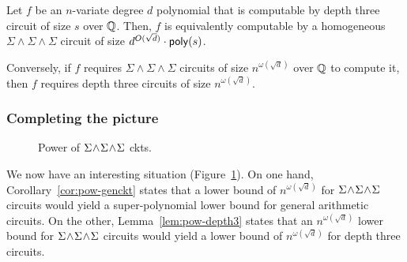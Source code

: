 \begin{lemma}\label{lem:pow-depth3}
Let $f$ be an $n$-variate degree $d$ polynomial that is computable by depth three circuit of size $s$ over $\mathbb{Q}$. Then, $f$ is equivalently computable by a homogeneous $\Sigma\!\wedge\!\Sigma\!\wedge\!\Sigma$ circuit of size $d^{O(\sqrt{d})}\cdot \mathsf{poly}(s)$. 

Conversely, if $f$ requires $\Sigma\!\wedge\!\Sigma\!\wedge\!\Sigma$ circuits of size $n^{\omega(\sqrt{d})}$ over $\mathbb{Q}$ to compute it, then $f$ requires depth three circuits of size $n^{\omega(\sqrt{d})}$. 
\end{lemma}

\subsubsection{Completing the picture}

\begin{figure}
\begin{center}
\end{center}
\caption{Power of $\Sigma\!\wedge\!\Sigma\!\wedge\!\Sigma$ ckts.}
\label{fig:SESES}
\end{figure}


We now have an interesting situation (Figure~\ref{fig:SESES}). On one hand, Corollary~\ref{cor:pow-genckt} states that a lower bound of $n^{\omega(\sqrt{d})}$ for $\Sigma\!\wedge\!\Sigma\!\wedge\!\Sigma$ circuits would yield a super-polynomial lower bound for general arithmetic circuits. On the other, Lemma~\ref{lem:pow-depth3} states that an $n^{\omega(\sqrt{d})}$ lower bound for $\Sigma\!\wedge\!\Sigma\!\wedge\!\Sigma$ circuits would yield a lower bound of $n^{\omega(\sqrt{d})}$ for depth three circuits. 

